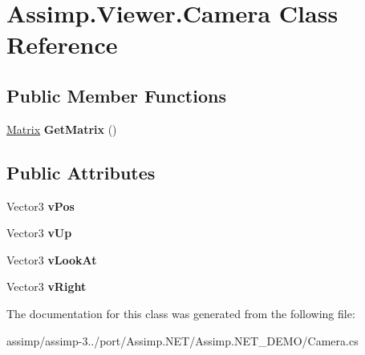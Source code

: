 \hypertarget{class_assimp_1_1_viewer_1_1_camera}{\section{Assimp.\+Viewer.\+Camera Class Reference}
\label{class_assimp_1_1_viewer_1_1_camera}
}
\subsection*{Public Member Functions}
\begin{DoxyCompactItemize}
\item 
\hypertarget{class_assimp_1_1_viewer_1_1_camera_a40fa93e9982f6f8f9654245702a4eb00}{\hyperlink{class_matrix}{Matrix} {\bfseries Get\+Matrix} ()}\label{class_assimp_1_1_viewer_1_1_camera_a40fa93e9982f6f8f9654245702a4eb00}

\end{DoxyCompactItemize}
\subsection*{Public Attributes}
\begin{DoxyCompactItemize}
\item 
\hypertarget{class_assimp_1_1_viewer_1_1_camera_a721c57c8e213f42b4029ad383ca41fba}{Vector3 {\bfseries v\+Pos}}\label{class_assimp_1_1_viewer_1_1_camera_a721c57c8e213f42b4029ad383ca41fba}

\item 
\hypertarget{class_assimp_1_1_viewer_1_1_camera_a587643f4bdc3482b8ebe3a807027396d}{Vector3 {\bfseries v\+Up}}\label{class_assimp_1_1_viewer_1_1_camera_a587643f4bdc3482b8ebe3a807027396d}

\item 
\hypertarget{class_assimp_1_1_viewer_1_1_camera_a5317028fab9664a2fd6848549f29ad68}{Vector3 {\bfseries v\+Look\+At}}\label{class_assimp_1_1_viewer_1_1_camera_a5317028fab9664a2fd6848549f29ad68}

\item 
\hypertarget{class_assimp_1_1_viewer_1_1_camera_aca1f68529177e3d725bf0099cc96515d}{Vector3 {\bfseries v\+Right}}\label{class_assimp_1_1_viewer_1_1_camera_aca1f68529177e3d725bf0099cc96515d}

\end{DoxyCompactItemize}


The documentation for this class was generated from the following file\+:\begin{DoxyCompactItemize}
\item 
assimp/assimp-\/3../port/\+Assimp.\+N\+E\+T/\+Assimp.\+N\+E\+T\+\_\+\+D\+E\+M\+O/Camera.\+cs\end{DoxyCompactItemize}
